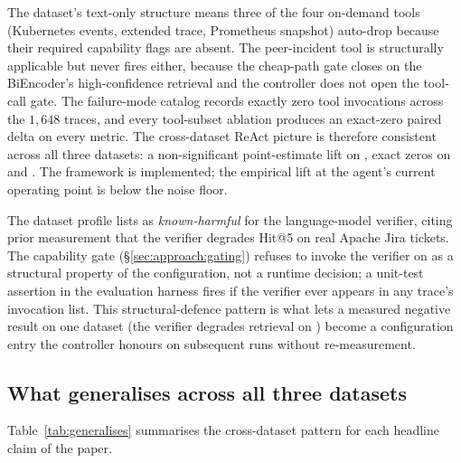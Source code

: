  The dataset's text-only structure means three of the four on-demand tools (Kubernetes events, extended trace, Prometheus snapshot) auto-drop because their required capability flags are absent. The peer-incident tool is structurally applicable but never fires either, because the cheap-path gate closes on the BiEncoder's high-confidence retrieval and the controller does not open the tool-call gate. The failure-mode catalog records exactly zero tool invocations across the $1{,}648$ traces, and every tool-subset ablation produces an exact-zero paired delta on every metric. The cross-dataset ReAct picture is therefore consistent across all three datasets: a non-significant point-estimate lift on \dsob{}, exact zeros on \dsotel{} and \dswol{}. The framework is implemented; the empirical lift at the agent's current operating point is below the noise floor.

 The dataset profile lists \dswol{} as \emph{known-harmful} for the language-model verifier, citing prior measurement that the verifier degrades Hit@5 on real Apache Jira tickets. The capability gate (\S\ref{sec:approach:gating}) refuses to invoke the verifier on \dswol{} as a structural property of the configuration, not a runtime decision; a unit-test assertion in the evaluation harness fires if the verifier ever appears in any \dswol{} trace's invocation list. This structural-defence pattern is what lets a measured negative result on one dataset (the verifier degrades retrieval on \dswol{}) become a configuration entry the controller honours on subsequent runs without re-measurement.

\subsection{What generalises across all three datasets}
\label{sec:cross-app:generalises}

Table~\ref{tab:generalises} summarises the cross-dataset pattern for each headline claim of the paper.

